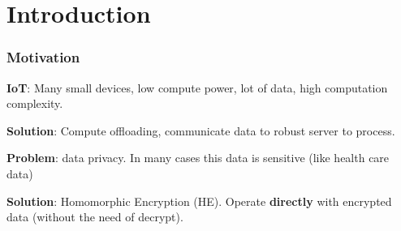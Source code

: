 \documentclass[10pt]{beamer}
\begin{document}

\section{Introduction}

\begin{frame}
    \frametitle{Motivation}

        \textbf{IoT}: Many small devices, low compute power, lot of data, high computation complexity.
    \vspace{-0.3cm}

        \textbf{Solution}: Compute offloading, communicate data to robust server to process.
    \vspace{-0.3cm}

\pause
        \textbf{Problem}: data privacy. In many cases this data is sensitive (like health care data)
    \vspace{-0.3cm}


\pause
          \textbf{Solution}: Homomorphic Encryption (HE). Operate \textbf{directly} with encrypted data (without the need of decrypt).
          \pause
\begin{columns}
\end{columns}
\end{frame}
\end{document}
